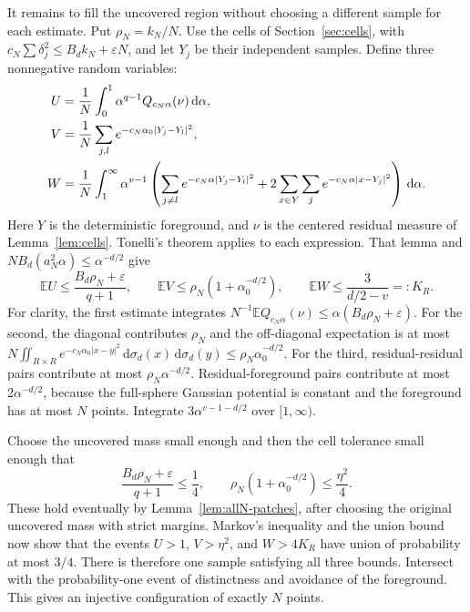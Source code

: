 \documentclass[11pt,a4paper]{article}
\theoremstyle{definition}
\newcommand{\E}{\mathbb E}
\newcommand{\dd}{\,\mathrm d}
\newcommand{\abs}[1]{\lvert#1\rvert}
\numberwithin{equation}{section}
\begin{document}
It remains to fill the uncovered region without choosing a different sample for each estimate. Put $\rho_N=k_N/N$. Use the cells of Section~\ref{sec:cells}, with
$c_N\sum\delta_j^2\le B_d k_N+\varepsilon N$, and let $Y_j$ be their independent samples. Define three nonnegative random variables:
\begin{align}
 U&=\frac1N\int_0^1\alpha^{q-1}Q_{c_N\alpha}(\nu)\dd\alpha,
                                                        \label{eq:selection-costs}\\
 V&=\frac1N\sum_{j,l}e^{-c_N\alpha_0\abs{Y_j-Y_l}^2},\notag\\
 W&=\frac1N\int_1^\infty\alpha^{v-1}
       \left(\sum_{j\ne l}e^{-c_N\alpha\abs{Y_j-Y_l}^2}
       +2\sum_{x\in Y}\sum_j e^{-c_N\alpha\abs{x-Y_j}^2}\right)\dd\alpha.\notag
\end{align}
Here $Y$ is the deterministic foreground, and $\nu$ is the centered residual measure of Lemma~\ref{lem:cells}. Tonelli's theorem applies to each expression. That lemma and $NB_d(a_N^2\alpha)\le\alpha^{-d/2}$ give
\begin{equation}\label{eq:selection-expectations}
 \E U\le\frac{B_d\rho_N+\varepsilon}{q+1},\qquad
 \E V\le\rho_N(1+\alpha_0^{-d/2}),\qquad
 \E W\le\frac3{d/2-v}=:K_R.
\end{equation}
For clarity, the first estimate integrates
$N^{-1}\E Q_{c_N\alpha}(\nu)\le\alpha(B_d\rho_N+\varepsilon)$.
For the second, the diagonal contributes $\rho_N$ and the off-diagonal expectation is at most
$N\iint_{R\times R}e^{-c_N\alpha_0\abs{x-y}^2}\dd\sigma_d(x)\dd\sigma_d(y)
\le\rho_N\alpha_0^{-d/2}$.
For the third, residual-residual pairs contribute at most $\rho_N\alpha^{-d/2}$. Residual-foreground pairs contribute at most $2\alpha^{-d/2}$, because the full-sphere Gaussian potential is constant and the foreground has at most $N$ points. Integrate $3\alpha^{v-1-d/2}$ over $[1,\infty)$.

Choose the uncovered mass small enough and then the cell tolerance small enough that
\begin{equation}\label{eq:selection-tolerances}
 \frac{B_d\rho_N+\varepsilon}{q+1}\le\frac14,
 \qquad \rho_N(1+\alpha_0^{-d/2})\le\frac{\eta^2}4.
\end{equation}
These hold eventually by Lemma~\ref{lem:allN-patches}, after choosing the original uncovered mass with strict margins. Markov's inequality and the union bound now show that the events
$U>1$, $V>\eta^2$, and $W>4K_R$ have union of probability at most $3/4$. There is therefore one sample satisfying all three bounds. Intersect with the probability-one event of distinctness and avoidance of the foreground. This gives an injective configuration of exactly $N$ points.
\end{document}
